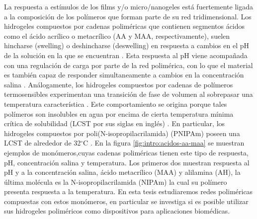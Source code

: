 La respuesta a est\'imulos de los films y/o micro/nanogeles est\'a fuertemente ligada a la composici\'on de los pol\'imeros que forman parte de su red tridimensional.
Los hidrogeles compuestos por cadenas polim\'ericas que contienen segmentos \'acidos como el \'acido acr\'ilico o metacr\'ilico (AA y MAA, respectivamente), suelen hincharse (swelling) o deshincharse (deswelling) en respuesta a cambios en el pH de la soluci\'on en la que se encuentran \cite{snowden1996colloidal}.
Esta respuesta al pH viene acompa\~nada con una regulaci\'on de carga por parte de la red polim\'erica, con lo que el material es tambi\'en capaz de responder simultaneamente a cambios en la concentraci\'on salina \cite{longo2019protonation}.
An\'alogamente, los hidrogeles compuestos por cadenas de pol\'imeros termosensibles experimentan una transici\'on de fase de volumen al sobrepasar una temperatura caracter\'istica \cite{Pelton1986,Pelton2000}.
Este comportamiento se origina porque tales pol\'imeros son insolubles en agua por encima de cierta temperatura m\'inima cr\'itica de solubilidad (LCST por sus siglas en ingl\'es) \cite{Kawaguchi2020}.
En particular, los hidrogeles compuestos por poli(N-isopropilacrilamida) (PNIPAm) poseen una LCST de alrededor de 32$^\circ$C \cite{Schild1992}.
En la figura \ref{fig:intro:acidos-aa-maa} se muestran ejemplos de mon\'omeros,cuyas cadenas polim\'ericas tienen este tipo de respuesta, pH, concentraci\'on salina y temperatura. Los primeros dos muestran respuesta al pH y a la concentraci\'on salina, \'acido metacr\'ilico (MAA) y  alilamina (AH), la \'ultima mol\'ecula es la N-isopropilacrilamida (NIPAm) la cual su pol\'imero presenta respuesta a la temperatura.
En esta tesis estudiaremos redes polim\'ericas compuestas con estos mon\'omeros, en particular se investiga si es posible utilizar sus hidrogeles polim\'ericos como dispositivos para aplicaciones biom\'edicas.  


